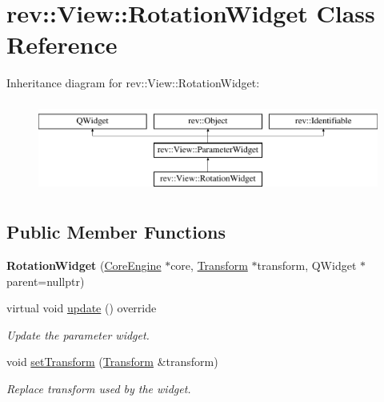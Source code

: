 \hypertarget{classrev_1_1_view_1_1_rotation_widget}{}\section{rev\+::View\+::Rotation\+Widget Class Reference}
\label{classrev_1_1_view_1_1_rotation_widget}
Inheritance diagram for rev\+::View\+::Rotation\+Widget\+:\begin{figure}[H]
\begin{center}
\leavevmode
\includegraphics[height=3.000000cm]{classrev_1_1_view_1_1_rotation_widget}
\end{center}
\end{figure}
\subsection*{Public Member Functions}
\begin{DoxyCompactItemize}
\item 
\mbox{\label{classrev_1_1_view_1_1_rotation_widget_a57abadf1d27e4d9d97007ce0878f67e4}} 
{\bfseries Rotation\+Widget} (\mbox{\hyperlink{classrev_1_1_core_engine}{Core\+Engine}} $\ast$core, \mbox{\hyperlink{classrev_1_1_transform}{Transform}} $\ast$transform, Q\+Widget $\ast$parent=nullptr)
\item 
\mbox{\label{classrev_1_1_view_1_1_rotation_widget_a4c1005f3e0102e5f04e2a904cd66953d}} 
virtual void \mbox{\hyperlink{classrev_1_1_view_1_1_rotation_widget_a4c1005f3e0102e5f04e2a904cd66953d}{update}} () override
\begin{DoxyCompactList}\small\item\em Update the parameter widget. \end{DoxyCompactList}\item 
\mbox{\label{classrev_1_1_view_1_1_rotation_widget_ae28d11fd27c0dcebaa20f79757612929}} 
void \mbox{\hyperlink{classrev_1_1_view_1_1_rotation_widget_ae28d11fd27c0dcebaa20f79757612929}{set\+Transform}} (\mbox{\hyperlink{classrev_1_1_transform}{Transform}} \&transform)
\begin{DoxyCompactList}\small\item\em Replace transform used by the widget. \end{DoxyCompactList}\end{DoxyCompactItemize}
